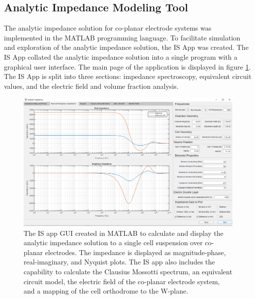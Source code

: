 


\subsection{Analytic Impedance Modeling Tool}

\par The analytic impedance solution for co-planar electrode systems was implemented in the MATLAB programming language. To facilitate simulation and exploration of the analytic impedance solution, the IS App was created. The IS App collated the analytic impedance solution into a single program with a graphical user interface. The main page of the application is displayed in figure \ref{fig:matlab_IS_app}. The IS App is split into three sections: impedance spectroscopy, equivalent circuit values, and the electric field and volume fraction analysis. 

\begin{figure}[h]
    \centering
    \includegraphics[width=\textwidth]{images/analyticImpedanceApp.png}
    \caption[IS App]{The IS app GUI created in MATLAB to calculate and display the analytic impedance solution to a single cell suspension over co-planar electrodes. The impedance is displayed as magnitude-phase, real-imaginary, and Nyquist plots. The IS app also includes the capability to calculate the Clausius Mossotti spectrum, an equivalent circuit model, the electric field of the co-planar electrode system, and a mapping of the cell orthodrome to the W-plane.}
    \label{fig:matlab_IS_app}
\end{figure}

